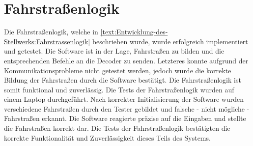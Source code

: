\section{Fahrstraßenlogik}\label{text:Auswertung:Fahrstrassenlogik}

Die Fahrstraßenlogik, welche in \autoref{text:Entwicklung-des-Stellwerks:Fahrstrassenlogik}  beschrieben wurde, wurde erfolgreich implementiert und getestet. Die Software ist in der Lage, Fahrstraßen zu bilden und die entsprechenden Befehle an die Decoder zu senden. Letzteres konnte aufgrund der Kommunikationsprobleme nicht getestet werden, jedoch wurde die korrekte Bildung der Fahrstraßen durch die Software bestätigt. Die Fahrstraßenlogik ist somit funktional und zuverlässig.
\newline
Die Tests der Fahrstraßenlogik wurden auf einem Laptop durchgeführt. Nach korrekter Initialisierung der Software wurden verschiedene Fahrstraßen durch den Tester gebildet und falsche - nicht mögliche - Fahrstraßen erkannt. Die Software reagierte präzise auf die Eingaben und stellte die Fahrstraßen korrekt dar. Die Tests der Fahrstraßenlogik bestätigten die korrekte Funktionalität und Zuverlässigkeit dieses Teils des Systems.